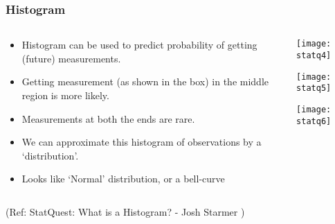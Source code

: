 \begin{frame}[fragile]\frametitle{Histogram}

\begin{columns}
    \begin{column}[T]{0.6\linewidth}

	\begin{itemize}
	\item Histogram can be used to predict probability of getting (future) measurements.
	\item Getting measurement (as shown in the box) in the middle region is more likely.
	\item Measurements at both the ends are rare.
	\item We can approximate this histogram of observations by a `distribution'.
	\item Looks like `Normal' distribution, or a bell-curve
	\end{itemize}

    \end{column}
    \begin{column}[T]{0.4\linewidth}
      \begin{center}
      \texttt{[image: statq4]}
	  
	  \texttt{[image: statq5]}
	  
	  \texttt{[image: statq6]}	  
	  	\end{center}
    \end{column}

  \end{columns}
  

\tiny{(Ref: StatQuest: What is a Histogram? - Josh Starmer )}
\end{frame}

